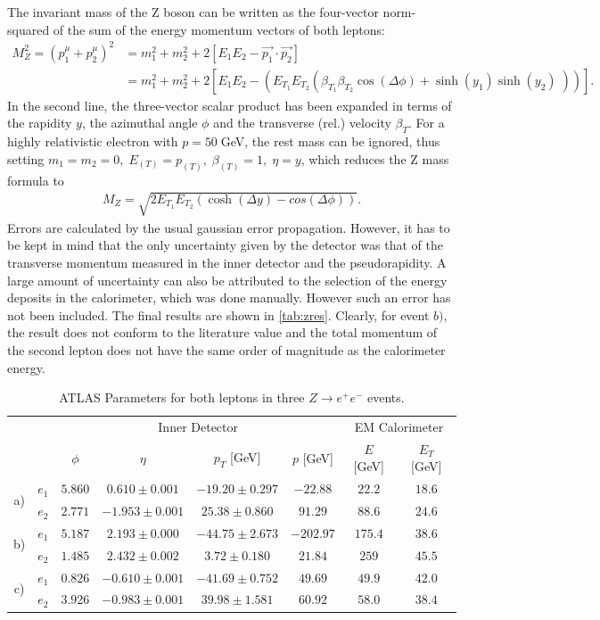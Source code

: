 \documentclass[twoside,        %
               BCOR12mm,       %
               ngerman,english, %
               fleqn,headsepline=false,footsepline=false
              ]{Vorlage/MFPREPORT}
\begin{document}
The invariant mass of the Z boson can be written as the four-vector
norm-squared of the sum of the energy momentum vectors of both leptons:
\begin{align}
    M_Z^2=(p_1^\mu+p_2^\mu)^2&=m_1^2+m_2^2+2[E_1
    E_2-\vec{p_1}\cdot\vec{p_2}]\\&=m_1^2+m_2^2+2[E_1
    E_2-(E_{T_1}E_{T_2}(\beta_{T_1}\beta_{T_2}\cos(\Delta\phi)+\sinh(y_1)\sinh(y_2)\;))].
\end{align}
In the second line, the three-vector scalar product has been expanded in terms
of the rapidity $y$, the azimuthal angle $\phi$ and the transverse (rel.)
velocity $\beta_T$. For a highly relativistic electron with $p=50\;$GeV, the rest mass can be
ignored, thus setting $m_1=m_2=0,\;E_{(T)}=p_{(T)},\;\beta_{(T)}=1,\;\eta=y$,
which reduces the Z mass formula to
\begin{align}
    \label{eq:zmass}
    M_Z=\sqrt{2E_{T_1}E_{T_2}(\cosh(\Delta y)-cos(\Delta\phi))}.
\end{align}
Errors are calculated by the usual gaussian error propagation. However, it has
to be kept in mind that the only uncertainty given by the detector was that of
the transverse momentum measured in the inner detector and the pseudorapidity.
A large amount of uncertainty can also be attributed to the selection of the
energy deposits in the calorimeter, which was done manually. However such an
error has not been included.
The final results are shown in \cref{tab:zres}. Clearly, for event $b)$, the
result does not conform to the literature value and the total momentum of the
second lepton does not have the same order of magnitude as the calorimeter
energy.
\begin{table}
\centering
\begin{tabular}{|c c|c|c|c|c|c|c|}
\hline
& & \multicolumn{4}{c|}{Inner Detector}&\multicolumn{2}{c|}{EM
Calorimeter}\\
& &$\phi$&$\eta$&$p_T$ [GeV]&$p$ [GeV]&$E$ [GeV]&$E_T$
[GeV]\\
\hline
\multirow{2}{*}{a)}&$e_1$&$5.860$&$0.610\pm
0.001$&$-19.20\pm 0.297$&$-22.88$&$22.2$&$18.6$\\
&$e_2$&$2.771$&$-1.953\pm 0.001$&$25.38\pm
0.860$&$91.29$&$88.6$&$24.6$\\
\hline
\multirow{2}{*}{b)}&$e_1$&$5.187$&$2.193\pm
0.000$&$-44.75\pm 2.673$&$-202.97$&$175.4$&$38.6$\\
&$e_2$&$1.485$&$2.432\pm 0.002$&$3.72\pm
0.180$&$21.84$&$259$&$45.5$\\
\hline
\multirow{2}{*}{c)}&$e_1$&$0.826$&$-0.610\pm
0.001$&$-41.69\pm
0.752$&$49.69$&$49.9$&$42.0$\\
&$e_2$&$3.926$&$-0.983\pm 0.001$&$39.98\pm
1.581$&$60.92$&$58.0$&$38.4$\\
\hline
\end{tabular}
\caption{ATLAS Parameters for both
leptons in three $Z\rightarrow e^+
e^-$ events.}
\label{tab:zrec}
\end{table}
\end{document}
